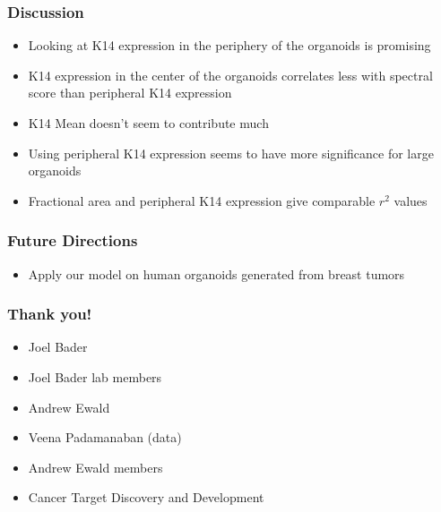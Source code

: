 \documentclass{beamer} %
\begin{document}
\begin{frame}
	\frametitle{Discussion}
	\begin{itemize}
			\item Looking at K14 expression in the periphery of the organoids is promising
			\item K14 expression in the center of the organoids correlates less with spectral score than peripheral K14 expression 
			\item K14 Mean doesn't seem to contribute much
			\item Using peripheral K14 expression seems to have more significance for large organoids 
			\item Fractional area and peripheral K14 expression give comparable $r^2$ values
	\end{itemize}
\end{frame}

\begin{frame}
	\frametitle{Future Directions}
	\begin{itemize}
			\item Apply our model on human organoids generated from breast tumors 
			\newline
	\end{itemize}
\end{frame}


\begin{frame}
 	\frametitle{Thank you!}
	\begin{itemize}
			\item Joel Bader
			\item Joel Bader lab members
			\newline
			\item Andrew Ewald
			\item Veena Padamanaban (data)
			\item Andrew Ewald members
			\newline
			\item Cancer Target Discovery and Development 
	\end{itemize}
\end{frame}
\end{document}
